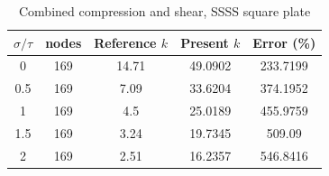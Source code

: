 \begin{table}[htbp]
\centering
\caption{Combined compression and shear, SSSS square plate}
\begin{tabular}{ccccc}
\hline
$\sigma/\tau$ & nodes & Reference $k$ & Present $k$ & Error (\%) \\
\hline
0 & 169 & 14.71 & 49.0902 & 233.7199 \\
0.5 & 169 & 7.09 & 33.6204 & 374.1952 \\
1 & 169 & 4.5 & 25.0189 & 455.9759 \\
1.5 & 169 & 3.24 & 19.7345 & 509.09 \\
2 & 169 & 2.51 & 16.2357 & 546.8416 \\
\hline
\end{tabular}
\end{table}



